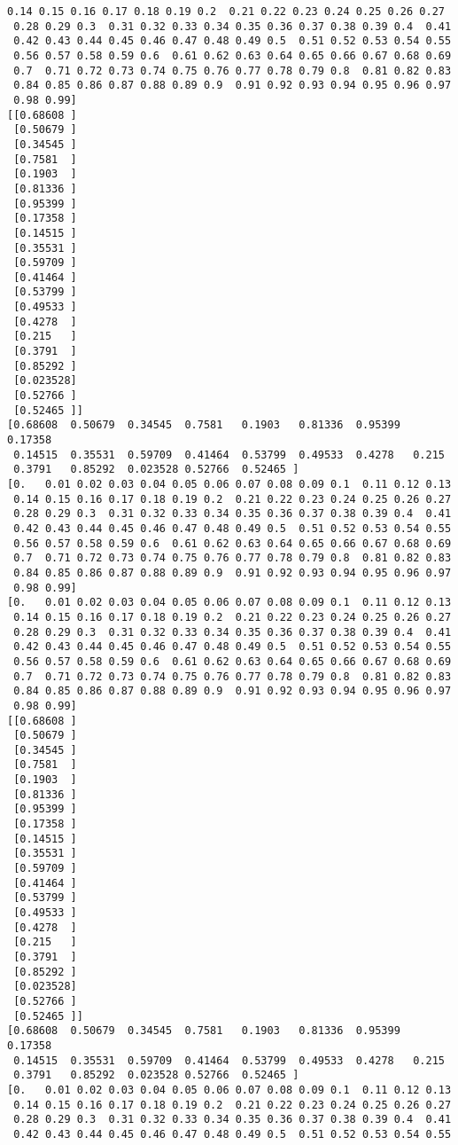 \documentclass[11pt]{article}
\begin{document}
\begin{Verbatim}[commandchars=\\\{\}]
 0.14 0.15 0.16 0.17 0.18 0.19 0.2  0.21 0.22 0.23 0.24 0.25 0.26 0.27
 0.28 0.29 0.3  0.31 0.32 0.33 0.34 0.35 0.36 0.37 0.38 0.39 0.4  0.41
 0.42 0.43 0.44 0.45 0.46 0.47 0.48 0.49 0.5  0.51 0.52 0.53 0.54 0.55
 0.56 0.57 0.58 0.59 0.6  0.61 0.62 0.63 0.64 0.65 0.66 0.67 0.68 0.69
 0.7  0.71 0.72 0.73 0.74 0.75 0.76 0.77 0.78 0.79 0.8  0.81 0.82 0.83
 0.84 0.85 0.86 0.87 0.88 0.89 0.9  0.91 0.92 0.93 0.94 0.95 0.96 0.97
 0.98 0.99]
[[0.68608 ]
 [0.50679 ]
 [0.34545 ]
 [0.7581  ]
 [0.1903  ]
 [0.81336 ]
 [0.95399 ]
 [0.17358 ]
 [0.14515 ]
 [0.35531 ]
 [0.59709 ]
 [0.41464 ]
 [0.53799 ]
 [0.49533 ]
 [0.4278  ]
 [0.215   ]
 [0.3791  ]
 [0.85292 ]
 [0.023528]
 [0.52766 ]
 [0.52465 ]]
[0.68608  0.50679  0.34545  0.7581   0.1903   0.81336  0.95399  0.17358
 0.14515  0.35531  0.59709  0.41464  0.53799  0.49533  0.4278   0.215
 0.3791   0.85292  0.023528 0.52766  0.52465 ]
[0.   0.01 0.02 0.03 0.04 0.05 0.06 0.07 0.08 0.09 0.1  0.11 0.12 0.13
 0.14 0.15 0.16 0.17 0.18 0.19 0.2  0.21 0.22 0.23 0.24 0.25 0.26 0.27
 0.28 0.29 0.3  0.31 0.32 0.33 0.34 0.35 0.36 0.37 0.38 0.39 0.4  0.41
 0.42 0.43 0.44 0.45 0.46 0.47 0.48 0.49 0.5  0.51 0.52 0.53 0.54 0.55
 0.56 0.57 0.58 0.59 0.6  0.61 0.62 0.63 0.64 0.65 0.66 0.67 0.68 0.69
 0.7  0.71 0.72 0.73 0.74 0.75 0.76 0.77 0.78 0.79 0.8  0.81 0.82 0.83
 0.84 0.85 0.86 0.87 0.88 0.89 0.9  0.91 0.92 0.93 0.94 0.95 0.96 0.97
 0.98 0.99]
[0.   0.01 0.02 0.03 0.04 0.05 0.06 0.07 0.08 0.09 0.1  0.11 0.12 0.13
 0.14 0.15 0.16 0.17 0.18 0.19 0.2  0.21 0.22 0.23 0.24 0.25 0.26 0.27
 0.28 0.29 0.3  0.31 0.32 0.33 0.34 0.35 0.36 0.37 0.38 0.39 0.4  0.41
 0.42 0.43 0.44 0.45 0.46 0.47 0.48 0.49 0.5  0.51 0.52 0.53 0.54 0.55
 0.56 0.57 0.58 0.59 0.6  0.61 0.62 0.63 0.64 0.65 0.66 0.67 0.68 0.69
 0.7  0.71 0.72 0.73 0.74 0.75 0.76 0.77 0.78 0.79 0.8  0.81 0.82 0.83
 0.84 0.85 0.86 0.87 0.88 0.89 0.9  0.91 0.92 0.93 0.94 0.95 0.96 0.97
 0.98 0.99]
[[0.68608 ]
 [0.50679 ]
 [0.34545 ]
 [0.7581  ]
 [0.1903  ]
 [0.81336 ]
 [0.95399 ]
 [0.17358 ]
 [0.14515 ]
 [0.35531 ]
 [0.59709 ]
 [0.41464 ]
 [0.53799 ]
 [0.49533 ]
 [0.4278  ]
 [0.215   ]
 [0.3791  ]
 [0.85292 ]
 [0.023528]
 [0.52766 ]
 [0.52465 ]]
[0.68608  0.50679  0.34545  0.7581   0.1903   0.81336  0.95399  0.17358
 0.14515  0.35531  0.59709  0.41464  0.53799  0.49533  0.4278   0.215
 0.3791   0.85292  0.023528 0.52766  0.52465 ]
[0.   0.01 0.02 0.03 0.04 0.05 0.06 0.07 0.08 0.09 0.1  0.11 0.12 0.13
 0.14 0.15 0.16 0.17 0.18 0.19 0.2  0.21 0.22 0.23 0.24 0.25 0.26 0.27
 0.28 0.29 0.3  0.31 0.32 0.33 0.34 0.35 0.36 0.37 0.38 0.39 0.4  0.41
 0.42 0.43 0.44 0.45 0.46 0.47 0.48 0.49 0.5  0.51 0.52 0.53 0.54 0.55

\end{Verbatim}
\end{document}
